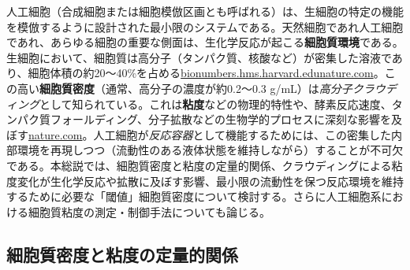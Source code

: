 人工細胞（合成細胞または細胞模倣区画とも呼ばれる）は、生細胞の特定の機能を模倣するように設計された最小限のシステムである。天然細胞であれ人工細胞であれ、あらゆる細胞の重要な側面は、生化学反応が起こる\textbf{細胞質環境}である。生細胞において、細胞質は高分子（タンパク質、核酸など）が密集した溶液であり、細胞体積の約20～40\%を占める\href{https://bionumbers.hms.harvard.edu/bionumber.aspx?s=n&v=12&id=105814\#:~:text=volume\%20for\%20excluded\%20volume\%20interactions\%2C,range\%20wasn\%27t\%20located\%20in\%20Kao}{bionumbers.hms.harvard.edu}\href{https://www.nature.com/articles/s41598-017-14883-y?error=cookies_not_supported&code=b0600d9e-c852-48ed-ab9c-7526a5c6893b\#:~:text=glassy\%20behaviors8\%20\%2C\%2033\%2C10\%20\%2C,driven}{nature.com}。この高い\textbf{細胞質密度}（通常、高分子の濃度が約0.2～0.3 g/mL）は\textit{高分子クラウディング}として知られている。これは\textbf{粘度}などの物理的特性や、酵素反応速度、タンパク質フォールディング、分子拡散などの生物学的プロセスに深刻な影響を及ぼす\href{https://www.nature.com/articles/nrmicro.2017.17?error=cookies_not_supported&code=87b4b2eb-5370-49be-862f-ed6bad1e1b44\#:~:text=Macromolecular\%20crowding\%20affects\%20the\%20mobility,we\%20propose\%20that\%20the\%20term}{nature.com}。人工細胞が\textit{反応容器}として機能するためには、この密集した内部環境を再現しつつ（流動性のある液体状態を維持しながら）することが不可欠である。本総説では、細胞質密度と粘度の定量的関係、クラウディングによる粘度変化が生化学反応や拡散に及ぼす影響、最小限の流動性を保つ反応環境を維持するために必要な「閾値」細胞質密度について検討する。さらに人工細胞系における細胞質粘度の測定・制御手法についても論じる。

\subsection{細胞質密度と粘度の定量的関係}

